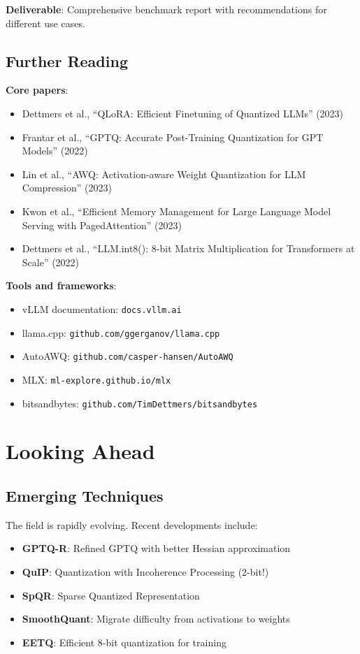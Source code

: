 \documentclass{article}
\begin{document}
\textbf{Deliverable}: Comprehensive benchmark report with recommendations for different use cases.

\subsection{Further Reading}

\textbf{Core papers}:
\begin{itemize}
\item Dettmers et al., ``QLoRA: Efficient Finetuning of Quantized LLMs'' (2023)
\item Frantar et al., ``GPTQ: Accurate Post-Training Quantization for GPT Models'' (2022)
\item Lin et al., ``AWQ: Activation-aware Weight Quantization for LLM Compression'' (2023)
\item Kwon et al., ``Efficient Memory Management for Large Language Model Serving with PagedAttention'' (2023)
\item Dettmers et al., ``LLM.int8(): 8-bit Matrix Multiplication for Transformers at Scale'' (2022)
\end{itemize}

\textbf{Tools and frameworks}:
\begin{itemize}
\item vLLM documentation: \texttt{docs.vllm.ai}
\item llama.cpp: \texttt{github.com/ggerganov/llama.cpp}
\item AutoAWQ: \texttt{github.com/casper-hansen/AutoAWQ}
\item MLX: \texttt{ml-explore.github.io/mlx}
\item bitsandbytes: \texttt{github.com/TimDettmers/bitsandbytes}
\end{itemize}

\section{Looking Ahead}

\subsection{Emerging Techniques}

The field is rapidly evolving. Recent developments include:

\begin{itemize}
\item \textbf{GPTQ-R}: Refined GPTQ with better Hessian approximation
\item \textbf{QuIP}: Quantization with Incoherence Processing (2-bit!)
\item \textbf{SpQR}: Sparse Quantized Representation
\item \textbf{SmoothQuant}: Migrate difficulty from activations to weights
\item \textbf{EETQ}: Efficient 8-bit quantization for training
\end{itemize}
\end{document}
